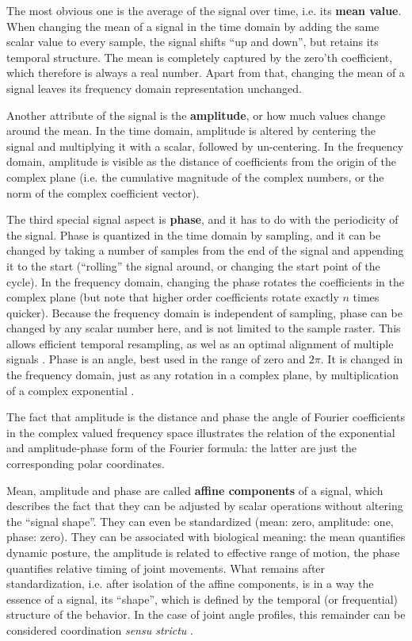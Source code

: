 The most obvious one is the average of the signal over time, i.e. its \textbf{mean value}.
When changing the mean of a signal in the time domain by adding the same scalar value to every sample, the signal shifts ``up and down'', but retains its temporal structure.
The mean is completely captured by the zero'th coefficient, which therefore is always a real number.
Apart from that, changing the mean of a signal leaves its frequency domain representation unchanged.

Another attribute of the signal is the \textbf{amplitude}, or how much values change around the mean.
In the time domain, amplitude is altered by centering the signal and multiplying it with a scalar, followed by un-centering.
In the frequency domain, amplitude is visible as the distance of coefficients from the origin of the complex plane (i.e. the cumulative magnitude of the complex numbers, or the norm of the complex coefficient vector).

The third special signal aspect is \textbf{phase}, and it has to do with the periodicity of the signal.
Phase is quantized in the time domain by sampling, and it can be changed by taking a number of samples from the end of the signal and appending it to the start (``rolling'' the signal around, or changing the start point of the cycle).
In the frequency domain, changing the phase rotates the coefficients in the complex plane (but note that higher order coefficients rotate exactly \(n\) times quicker).
Because the frequency domain is independent of sampling, phase can be changed by any scalar number here, and is not limited to the sample raster.
This allows efficient temporal resampling, as wel as an optimal alignment of multiple signals \citep[\textit{cf.} supplementary information of][]{Mielke2019}.
Phase is an angle, best used in the range of zero and \(2\pi\).
It is changed in the frequency domain, just as any rotation in a complex plane, by multiplication of a complex exponential \citep["delay/shift theorem", \textit{cf.}][]{Bracewell2000}.

The fact that amplitude is the distance and phase the angle of Fourier coefficients in the complex valued frequency space illustrates the relation of the exponential and amplitude-phase form of the Fourier formula: the latter are just the corresponding polar coordinates.


Mean, amplitude and phase are called \textbf{affine components} of a signal, which describes the fact that they can be adjusted by scalar operations without altering the ``signal shape''.
They can even be standardized (mean: zero, amplitude: one, phase: zero).
They can be associated with biological meaning: the mean quantifies dynamic posture, the amplitude is related to effective range of motion, the phase quantifies relative timing of joint movements.
What remains after standardization, i.e. after isolation of the affine components, is in a way the essence of a signal, its ``shape'', which is defined by the temporal (or frequential) structure of the behavior.
In the case of joint angle profiles, this remainder can be considered coordination \emph{sensu strictu} \citep{Mielke2019,Mielke2022}.

